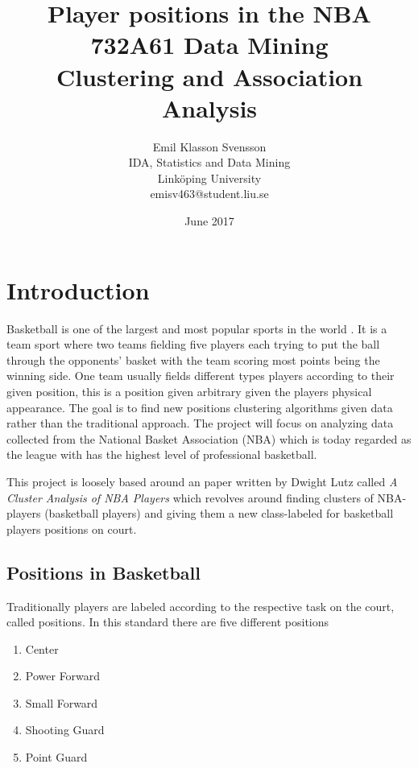 \documentclass{article}
\title{Player positions in the NBA \\
\large  732A61 Data Mining \\
 Clustering and Association Analysis }
\author{Emil Klasson Svensson
 \\IDA, Statistics and Data Mining
\\Linköping University
\\emisv463@student.liu.se}
\date{June 2017}
\begin{document}
\maketitle
\thispagestyle{empty}
\newpage

\section{Introduction}

Basketball is one of the largest and most popular sports in the world . It is a team sport where two teams fielding five players each trying to put the ball through the opponents’ basket with the team scoring most points being the winning side. One team usually fields different types players according to their given position, this is a position given arbitrary given the players physical appearance. \cite{wikibasket} The goal is to find new positions clustering algorithms given data rather than the traditional approach. The project will focus on analyzing data collected from the National Basket Association (NBA) which is today regarded as the league with has the highest level of professional basketball.
 
This project is loosely based around an paper written by Dwight Lutz called \textit{A Cluster Analysis of NBA Players} \cite{lutz2012cluster} which revolves around finding clusters of NBA-players (basketball players) and giving them a new class-labeled for basketball players positions on court.




\subsection{Positions in Basketball}

Traditionally players are labeled according to the respective task on the court, called positions. In this standard there are five different positions

\begin{enumerate}
\item Center 
\item Power Forward
\item Small Forward
\item Shooting Guard
\item Point Guard
\end{enumerate}
\end{document}
